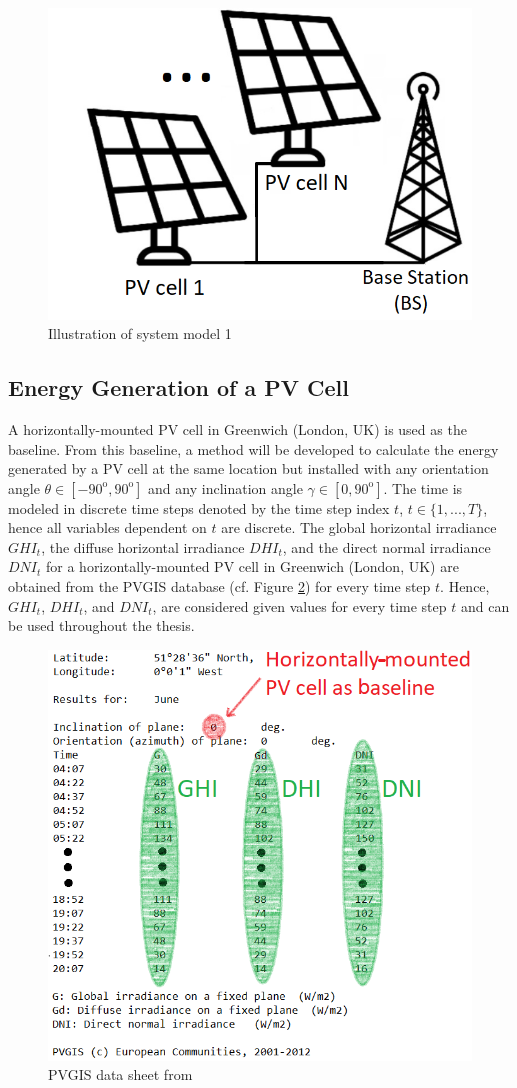 \begin{figure}[H]
\centering
\includegraphics[width=0.6\columnwidth]{pictures/SystemSetup}
\caption{Illustration of system model 1\label{ene}}
\end{figure}

\subsection{Energy Generation of a PV Cell\label{gen}}

A horizontally-mounted PV cell in Greenwich (London, UK) is used as the baseline. From this baseline, a method will be developed to calculate the energy generated by a PV cell at the same location but installed with any orientation angle $\theta \in [-90^{\mathrm{o}},90^{\mathrm{o}}]$ and any inclination angle $\gamma\in[0,90^\mathrm{o}]$. The time is modeled in discrete time steps denoted by the time step index $t$, $t \in \{1,...,T\}$, hence all variables dependent on $t$ are discrete. The global horizontal irradiance $GHI_t$, the diffuse horizontal irradiance $DHI_t$, and the direct normal irradiance $DNI_t$ for a horizontally-mounted PV cell in Greenwich (London, UK) are obtained from the PVGIS database (cf. Figure \ref{PVGIS_datasheet}) for every time step $t$. Hence, $GHI_t$, $DHI_t$, and $DNI_t$, are considered given values for every time step $t$ and can be used throughout the thesis. 

\begin{figure}[H]
	\centering
		\includegraphics[width=0.7\columnwidth]{pictures/Greenwich5}
\caption[PVGIS data sheet]{PVGIS data sheet from \cite{PVGIS}\label{PVGIS_datasheet}}
\end{figure}

